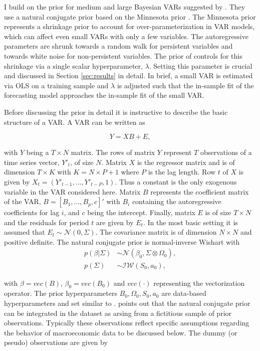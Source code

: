 \documentclass[12pt,letterpaper,fleqn]{article}           %
\begin{document}
I build on the prior for medium and large Bayesian VARs suggested by \textcite{banbura10}. They use a natural conjugate prior based on the Minnesota prior \parencite{doan84, litterman86}. The Minnesota prior represents a shrinkage prior to account for over-parameterization in VAR models, which can affect even small VARs with only a few variables. The autoregressive parameters are shrunk towards a random walk for persistent variables and towards white noise for non-persistent variables. The prior of \textcite{banbura10} controls for this shrinkage via a single scalar hyperparameter, $\lambda$. Setting this parameter is crucial and discussed in Section \ref{sec:results} in detail. In brief, a small VAR is estimated via OLS on a training sample and $\lambda$ is adjusted such that the in-sample fit of the forecasting model approaches the in-sample fit of the small VAR. 

Before discussing the prior in detail it is instructive to describe the basic structure of a VAR. A VAR can be written as

\begin{equation}
Y = XB + E,
\label{eq:var_intro}
\end{equation}

with $Y$ being a $T \times N$ matrix. The rows of matrix $Y$ represent $T$ observations of a time series vector, $Y'_t$, of size $N$. Matrix $X$ is the regressor matrix and is of dimension $T \times K$ with $K = N \times P + 1$ where $P$ is the lag length. Row $t$ of $X$ is given by $X_t = (Y'_{t-1}, \ldots, Y'_{t-P}, 1)$. Thus a constant is the only exogenous variable in the VAR considered here. Matrix $B$ represents the coefficient matrix of the VAR, $B = [B_1,\ldots,B_p,c]'$ with $B_i$ containing the autoregressive coefficients for lag $i$, and $c$ being the intercept. Finally, matrix $E$ is of size $T \times N$ and the residuals for period $t$ are given by $E_t$. In the most basic setting it is assumed that $E_t \sim \mathcal{N}(0, \Sigma)$. The covariance matrix is of dimension $N \times N$ and positive definite. The natural conjugate prior is normal-inverse Wishart with
\begin{align}
p(\beta|\Sigma) &\sim \mathcal{N}(\beta_0, \Sigma \otimes \Omega_0), \label{eq:var_prior1} \\
p(\Sigma) &\sim \mathcal{IW}(S_0, a_0),
\label{eq:var_prior2}
\end{align}

with $\beta = vec(B)$, $\beta_0 = vec(B_0)$ and $vec(\cdot)$ representing the vectorization operator. The prior hyperparameters $B_0, \Omega_0, S_0, a_0$ are data-based hyperparameters and set similar to \textcite{banbura10}. \textcite{koop13} points out that the natural conjugate prior can be integrated in the dataset as arsing from a fictitious sample of prior observations. Typically these observations reflect specific assumptions regarding the behavior of macroeconomic data to be discussed below. The dummy (or pseudo) observations are given by
\end{document}
